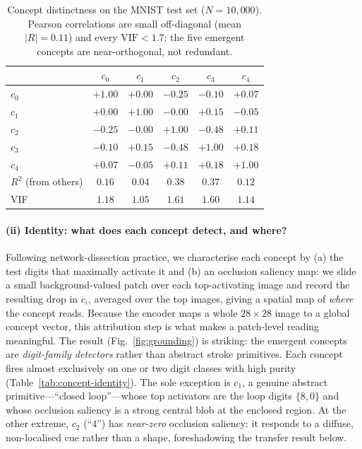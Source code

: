 \begin{table}[t]
\centering
\small
\begin{tabular}{lccccc}
\toprule
 & $c_0$ & $c_1$ & $c_2$ & $c_3$ & $c_4$ \\
\midrule
$c_0$ & $+1.00$ & $+0.00$ & $-0.25$ & $-0.10$ & $+0.07$ \\
$c_1$ & $+0.00$ & $+1.00$ & $-0.00$ & $+0.15$ & $-0.05$ \\
$c_2$ & $-0.25$ & $-0.00$ & $+1.00$ & $-0.48$ & $+0.11$ \\
$c_3$ & $-0.10$ & $+0.15$ & $-0.48$ & $+1.00$ & $+0.18$ \\
$c_4$ & $+0.07$ & $-0.05$ & $+0.11$ & $+0.18$ & $+1.00$ \\
\midrule
$R^2$ (from others) & $0.16$ & $0.04$ & $0.38$ & $0.37$ & $0.12$ \\
VIF & $1.18$ & $1.05$ & $1.61$ & $1.60$ & $1.14$ \\
\bottomrule
\end{tabular}
\caption{Concept distinctness on the MNIST test set ($N=10{,}000$). Pearson
correlations are small off-diagonal (mean $|R|=0.11$) and every
$\mathrm{VIF}<1.7$: the five emergent concepts are near-orthogonal, not
redundant.}
\label{tab:concept-distinctness}
\end{table}

\paragraph{(ii) Identity: what does each concept detect, and where?}
Following network-dissection practice, we characterise each concept by (a) the
test digits that maximally activate it and (b) an occlusion saliency map: we
slide a small background-valued patch over each top-activating image and record
the resulting drop in $c_i$, averaged over the top images, giving a spatial map
of \emph{where} the concept reads. Because the encoder maps a whole
$28\times28$ image to a global concept vector, this attribution step is what
makes a patch-level reading meaningful. The result (Fig.~\ref{fig:grounding}) is
striking: the emergent concepts are \emph{digit-family detectors} rather than
abstract stroke primitives. Each concept fires almost exclusively on one or two
digit classes with high purity (Table~\ref{tab:concept-identity}). The sole
exception is $c_1$, a genuine abstract primitive---``closed loop''---whose top
activators are the loop digits $\{8,0\}$ and whose occlusion saliency is a
strong central blob at the enclosed region. At the other extreme, $c_2$
(``$4$'') has \emph{near-zero} occlusion saliency: it responds to a diffuse,
non-localised cue rather than a shape, foreshadowing the transfer result below.

